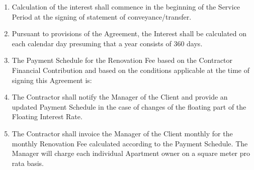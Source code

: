 \begin{enumerate}[label=\arabic*.]
	\item Calculation of the interest shall commence in the beginning of the Service Period at the signing of statement of conveyance/transfer.
	\item Pursuant to provisions of the Agreement, the Interest shall be calculated on each calendar day presuming that a year consists of 360 days.
	\item The Payment Schedule for the Renovation Fee based on the Contractor Financial Contribution and based on the conditions applicable at the time of signing this Agreement is:


\begin{center}
\end{center}

	\item The Contractor shall notify the Manager of the Client and provide an updated Payment Schedule in the case of changes of the floating part of the Floating Interest Rate.
	\item The Contractor shall invoice the Manager of the Client monthly for the monthly Renovation Fee calculated according to the Payment Schedule. The Manager will charge each individual Apartment owner on a square meter pro rata basis.
\end{enumerate}
